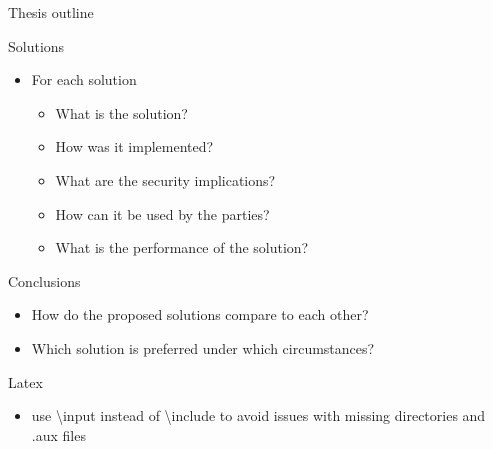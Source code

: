 \begin{frame}{Thesis outline}
\begin{block}{Solutions}
\protect\hypertarget{solutions}{}
\begin{itemize}
\tightlist
\item
  For each solution

  \begin{itemize}
  \tightlist
  \item
    What is the solution?
  \item
    How was it implemented?
  \item
    What are the security implications?
  \item
    How can it be used by the parties?
  \item
    What is the performance of the solution?
  \end{itemize}
\end{itemize}
\end{block}

\begin{block}{Conclusions}
\protect\hypertarget{conclusions}{}
\begin{itemize}
\tightlist
\item
  How do the proposed solutions compare to each other?
\item
  Which solution is preferred under which circumstances?
\end{itemize}
\end{block}
\end{frame}

\begin{frame}{Latex}
\protect\hypertarget{latex}{}
\begin{itemize}
\tightlist
\item
  use \textbackslash input instead of \textbackslash include to avoid
  issues with missing directories and .aux files
\end{itemize}
\end{frame}
